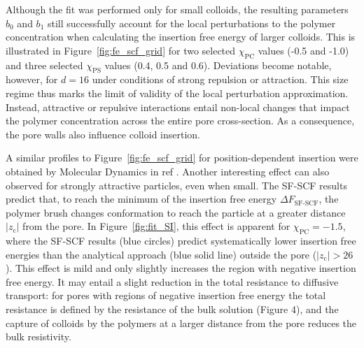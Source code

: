 \documentclass[10pt, a4paper]{article}
\begin{document}
\begin{multicols}{2}
Although the fit was performed only for small colloids, the resulting parameters $b_{0}$ and $b_{1}$ still successfully account for the local perturbations to the polymer concentration when calculating the insertion free energy of larger colloids.
This is illustrated in Figure~\ref{fig:fe_scf_grid} for two selected $\chi_{\text{PC}}$ values (-0.5 and -1.0) and three selected $\chi_{\text{PS}}$ values (0.4, 0.5 and 0.6).
Deviations become notable, however, for $d = 16$ under conditions of strong repulsion or attraction.
This size regime thus marks the limit of validity of the local perturbation approximation.
Instead, attractive or repulsive interactions entail non-local changes that impact the polymer concentration across the entire pore cross-section.
As a consequence, the pore walls also influence colloid insertion. 

A similar profiles to Figure~\ref{fig:fe_scf_grid} for position-dependent insertion were obtained by Molecular Dynamics in ref \cite{Ananth2018, Tagliazucchi2018}.
Another interesting effect can also observed for strongly attractive particles, even when small.
The SF-SCF results predict that, to reach the minimum of the insertion free energy $\Delta F_{\text{SF-SCF}}$, the polymer brush changes conformation to reach the particle at a greater distance $|z_{\text{c}}|$ from the pore.
In Figure~\ref{fig:fit_SI}, this effect is apparent for $\chi_{\text{PC}} = -1.5$, where the SF-SCF results (blue circles) predict systematically lower insertion free energies than the analytical approach (blue solid line) outside the pore ($|z_{\text{c}}| > 26$).
This effect is mild and only slightly increases the region with negative insertion free energy.
It may entail a slight reduction in the total resistance to diffusive transport: for pores with regions of negative insertion free energy the total resistance is defined by the resistance of the bulk solution (Figure 4), and the capture of colloids by the polymers at a larger distance from the pore reduces the bulk resistivity.


\end{multicols}
\end{document}
